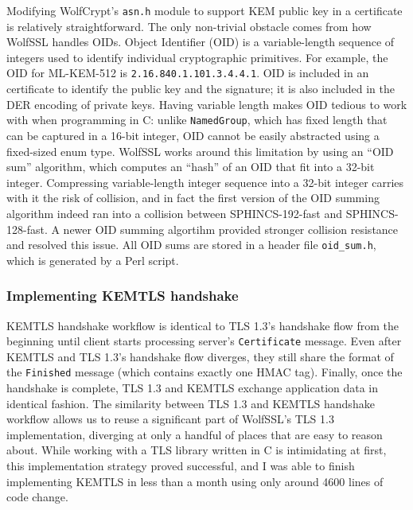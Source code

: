\documentclass[letterpaper,12pt,titlepage,oneside,final]{book}
\begin{document}
Modifying WolfCrypt's \texttt{asn.h} module to support KEM public key in a certificate is relatively straightforward. The only non-trivial obstacle comes from how WolfSSL handles OIDs. Object Identifier (OID) is a variable-length sequence of integers used to identify individual cryptographic primitives. For example, the OID for ML-KEM-512 is \texttt{2.16.840.1.101.3.4.4.1}. OID is included in an certificate to identify the public key and the signature; it is also included in the DER encoding of private keys. Having variable length makes OID tedious to work with when programming in C: unlike \texttt{NamedGroup}, which has fixed length that can be captured in a 16-bit integer, OID cannot be easily abstracted using a fixed-sized enum type. WolfSSL works around this limitation by using an ``OID sum'' algorithm, which computes an ``hash'' of an OID that fit into a 32-bit integer. Compressing variable-length integer sequence into a 32-bit integer carries with it the risk of collision, and in fact the first version of the OID summing algorithm indeed ran into a collision between SPHINCS-192-fast and SPHINCS-128-fast. A newer OID summing algortihm provided stronger collision resistance and resolved this issue. All OID sums are stored in a header file \texttt{oid\_sum.h}, which is generated by a Perl script.

\subsubsection{Implementing KEMTLS handshake}
KEMTLS handshake workflow is identical to TLS 1.3's handshake flow from the beginning until client starts processing server's \texttt{Certificate} message.
Even after KEMTLS and TLS 1.3's handshake flow diverges, they still share the format of the \texttt{Finished} message (which contains exactly one HMAC tag).
Finally, once the handshake is complete, TLS 1.3 and KEMTLS exchange application data in identical fashion.
The similarity between TLS 1.3 and KEMTLS handshake workflow allows us to reuse a significant part of WolfSSL's TLS 1.3 implementation, diverging at only a handful of places that are easy to reason about.
While working with a TLS library written in C is intimidating at first, this implementation strategy proved successful, and I was able to finish implementing KEMTLS in less than a month using only around 4600 lines of code change.
\end{document}
